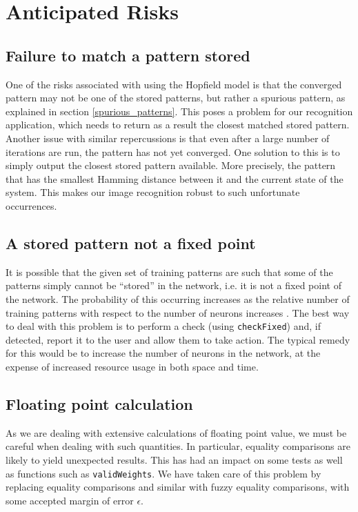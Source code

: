 \section{Anticipated Risks}

\subsection{Failure to match a pattern stored}
One of the risks associated with using the Hopfield model is that the converged pattern may not be one of the stored patterns, but rather a spurious pattern, as explained in section \ref{spurious_patterns}. This poses a problem for our recognition application, which needs to return as a result the closest matched stored pattern. Another issue with similar repercussions is that even after a large number of iterations are run, the pattern has not yet converged.
One solution to this  is to simply output the closest stored pattern available. More precisely, the pattern that has the smallest Hamming distance between it and the current state of the system. This makes our image recognition robust to such unfortunate occurrences.


\subsection{A stored pattern not a fixed point}
It is possible that the given set of training patterns are such that some of the patterns simply cannot be ``stored'' in the network, i.e. it is not a fixed point of the network. The probability of this occurring increases as the relative number of training patterns with respect to the number of neurons increases .
The best way to deal with this problem is to perform a check (using \texttt{checkFixed})  and, if detected, report it  to the user and allow them to take action. The typical remedy for this would be to increase the number of neurons in the network, at the expense of increased resource usage in both space and time.


\subsection{Floating point calculation}
As we are dealing with extensive calculations of floating point value, we must be careful when dealing with such quantities. In particular, equality comparisons are likely to yield unexpected results. This has had an impact on some tests as well as functions such as \texttt{validWeights}. We have taken care of this problem by replacing equality comparisons and similar with fuzzy equality comparisons, with some accepted margin of error $\epsilon$.

